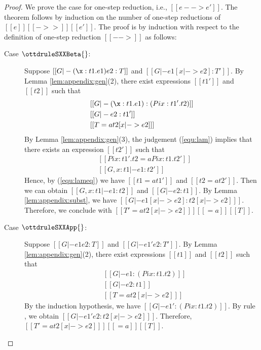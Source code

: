 \begin{proof}
    We prove the case for one-step reduction, i.e., $[[e --> e']]$. The theorem
follows by induction on the number of one-step reductions of $[[e]] [[->>]]
[[e']]$.
    The proof is by induction with respect to the definition of one-step
reduction $[[-->]]$ as follows:
    \begin{description}
        \item[Case $\ottdruleSXXBeta{}$:] $\quad$ \\
        Suppose $[[G |- (\x:t1.e1)e2 :T]]$ and $[[G |- e1 [x |-> e2] :T']]$. By
Lemma \ref{lem:appendix:gen}(2), there exist expressions $[[t1']]$ and $[[t2]]$
such that 
        \begin{align}
            &[[G |- (\x:t1.e1):(Pi x:t1'.t2)]] \label{equ:lam} \\
            &[[G |- e2:t1']] \nonumber \\
            &[[T =a t2 [x |-> e2] ]] \nonumber
        \end{align}
        By Lemma \ref{lem:appendix:gen}(3), the judgement (\ref{equ:lam})
implies that there exists an expression $[[t2']]$ such that
        \begin{align}
            &[[Pi x:t1'.t2 =a Pi x:t1.t2']] \label{equ:lameq}\\
            &[[G, x:t1 |- e1:t2']] \nonumber
        \end{align}
        Hence, by (\ref{equ:lameq}) we have $[[t1 =a t1']]$ and $[[t2 =a
t2']]$. Then we can obtain $[[G, x:t1 |- e1:t2]]$ and $[[G |- e2:t1]]$. By
Lemma \ref{lem:appendix:subst}, we have $[[G |- e1[x |-> e2] : t2[x |-> e2]
]]$. Therefore, we conclude with $[[T' =a t2[x |-> e2] ]] [[=a]] [[T]]$.
        
        \item[Case $\ottdruleSXXApp{}$:] $\quad$ \\
        Suppose $[[G |- e1 e2 :T]]$ and $[[G |- e1' e2 :T']]$. By Lemma
\ref{lem:appendix:gen}(2), there exist expressions $[[t1]]$ and $[[t2]]$ such
that 
        \begin{align*}
            &[[G |- e1:(Pi x:t1.t2)]] \\
            &[[G |- e2:t1]]\\
            &[[T =a t2 [x |-> e2] ]]
        \end{align*}
        By the induction hypothesis, we have $[[G |- e1':(Pi x:t1.t2)]]$. By rule
, we obtain $[[G |- e1' e2 : t2[x |-> e2] ]]$. Therefore, $[[T'
=a t2[x |-> e2] ]] [[=a]] [[T]]$.
        

\end{description}
\end{proof}
